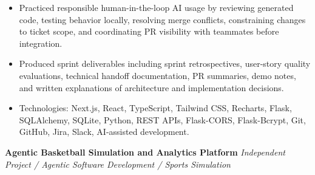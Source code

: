 \documentclass[10.5pt,letterpaper]{article}
\begin{document}
\begin{itemize}
\item Practiced responsible human-in-the-loop AI usage by reviewing generated code, testing behavior locally, resolving merge conflicts, constraining changes to ticket scope, and coordinating PR visibility with teammates before integration.
\item Produced sprint deliverables including sprint retrospectives, user-story quality evaluations, technical handoff documentation, PR summaries, demo notes, and written explanations of architecture and implementation decisions.
\item Technologies: Next.js, React, TypeScript, Tailwind CSS, Recharts, Flask, SQLAlchemy, SQLite, Python, REST APIs, Flask-CORS, Flask-Bcrypt, Git, GitHub, Jira, Slack, AI-assisted development.
\end{itemize}
\textbf{Agentic Basketball Simulation and Analytics Platform} \hfill \textit{Independent Project / Agentic Software Development / Sports Simulation}\par
\end{document}
